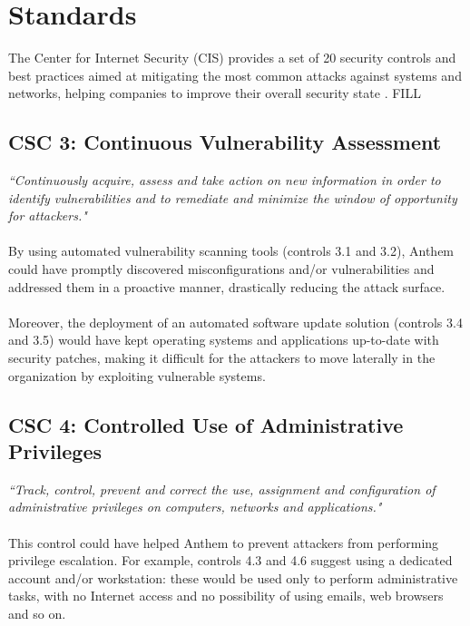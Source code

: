 \section{Standards} 
	The Center for Internet Security (CIS) provides a set of 20 security controls and best practices aimed at mitigating the most common attacks against systems and networks, helping companies to improve their overall security state \cite{cis}. FILL\\

	\subsection{CSC 3: Continuous Vulnerability Assessment}
	\textit{``Continuously acquire, assess and take action on new information in order to identify vulnerabilities and to remediate and minimize the window of opportunity for attackers."}\\\\
	By using automated vulnerability scanning tools (controls 3.1 and 3.2), Anthem could have promptly discovered misconfigurations and/or vulnerabilities and addressed them in a proactive manner, drastically reducing the attack surface.\\\\
	Moreover, the deployment of an automated software update solution (controls 3.4 and 3.5) would have kept operating systems and applications up-to-date with security patches, making it difficult for the attackers to move laterally in the organization by exploiting vulnerable systems.
	\subsection{CSC 4: Controlled Use of Administrative Privileges}
	\textit{``Track, control, prevent and correct the use, assignment and configuration of administrative privileges on computers, networks and applications."}\\\\
	This control could have helped Anthem to prevent attackers from performing privilege escalation. For example, controls 4.3 and 4.6 suggest using a dedicated account and/or workstation: these would be used only to perform administrative tasks, with no Internet access and no possibility of using emails, web browsers and so on.
	
